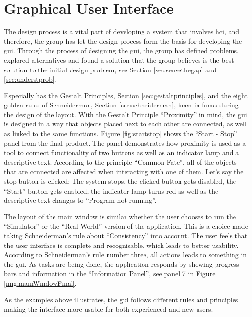 



\section{Graphical User Interface}
The design process is a vital part of developing a system that involves \acrfull{hci}, and therefore, the group has let the design process form the basis for developing the \acrlong{gui}. Through the process of designing the \acrshort{gui}, the group has defined problems, explored alternatives and found a solution that the group believes is the best solution to the initial design problem, see Section \ref{sec:sensethegap} and \ref{sec:understprob}.

Especially has the Gestalt Principles, Section \ref{sec:gestaltprinciples}, and the eight golden rules of Schneiderman, Section \ref{sec:schneiderman}, been in focus during the design of the layout. With the Gestalt Principle ``Proximity'' in mind, the \acrshort{gui} is designed in a way that objects placed next to each other are connected, as well as linked to the same functions. Figure \ref{fig:startstop} shows the ``Start - Stop'' panel from the final product. The panel demonstrates how proximity is used as a tool to connect functionality of two buttons as well as an indicator lamp and a descriptive text. According to the principle ``Common Fate'', all of the objects that are connected are affected when interacting with one of them. Let's say the stop button is clicked; The system stops, the clicked button gets disabled, the ``Start'' button gets enabled, the indicator lamp turns red as well as the descriptive text changes to ``Program not running''.


The layout of the main window is similar whether the user chooses to run the ``Simulator'' or the ``Real World'' version of the application. This is a choice made taking Schneiderman's rule about ``Consistency'' into account. The user feels that the user interface is complete and recognisable, which leads to better usability. According to Schneiderman's rule number three, all actions leads to something in the \acrshort{gui}. As tasks are being done, the application responds by showing progress bars and information in the ``Information Panel'', see panel 7 in Figure \ref{img:mainWindowFinal}. 

As the examples above illustrates, the \acrshort{gui} follows different rules and principles making the interface more usable for both experienced and new users.
